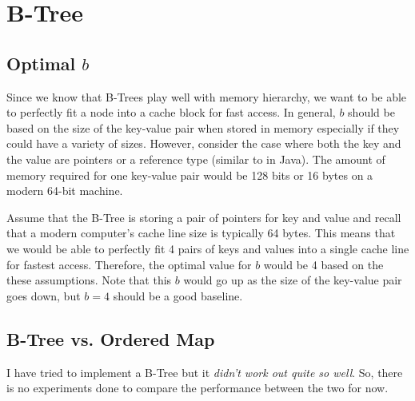 \section{B-Tree}

\subsection{Optimal $b$}

Since we know that B-Trees play well with memory hierarchy, we want to be able to perfectly fit a node into a cache block for fast access.
In general, $b$ should be based on the size of the key-value pair when stored in memory especially if they could have a variety of sizes.
However, consider the case where both the key and the value are pointers or a reference type (similar to in Java).
The amount of memory required for one key-value pair would be 128 bits or 16 bytes on a modern 64-bit machine.

Assume that the B-Tree is storing a pair of pointers for key and value and recall that a modern computer's cache line size is typically 64 bytes. This means that we would be able to perfectly fit 4 pairs of keys and values into a single cache line for fastest access. Therefore, the optimal value for $b$ would be 4 based on the these assumptions. Note that this $b$ would go up as the size of the key-value pair goes down, but $b = 4$ should be a good baseline.

\subsection{B-Tree vs. Ordered Map}

I have tried to implement a B-Tree but it \textit{didn't work out quite so well}. So, there is no experiments done to compare the performance between the two for now.
